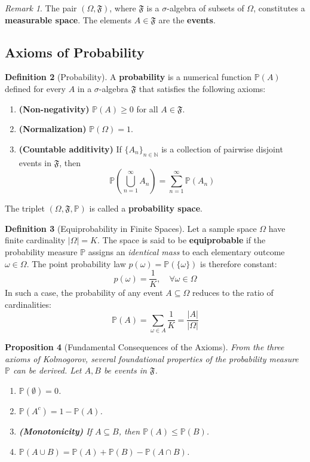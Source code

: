 \documentclass[12pt, openany]{book}
\theoremstyle{definition}
\newtheorem{definition}{Definition}[section]
\theoremstyle{plain}
\newtheorem{proposition}[definition]{Proposition}
\theoremstyle{remark}
\newtheorem{remark}[definition]{Remark}
\newcommand{\N}{\mathbb{N}}
\newcommand{\probP}{\mathbb{P}}
\newcommand{\germF}{\mathfrak{F}} %
\begin{document}
\begin{remark}
The pair $(\Omega, \germF)$, where $\germF$ is a $\sigma$-algebra of subsets of $\Omega$, constitutes a \textbf{measurable space}. The elements $A \in \germF$ are the \textbf{events}.
\end{remark}

\subsection{Axioms of Probability}

\begin{definition}[Probability]
A \textbf{probability} is a numerical function $\probP(A)$ defined for every $A$ in a $\sigma$-algebra $\germF$ that satisfies the following axioms:
\begin{enumerate}
    \item \textbf{(Non-negativity)} $\probP(A) \ge 0$ for all $A \in \germF$.
    \item \textbf{(Normalization)} $\probP(\Omega) = 1$.
    \item \textbf{(Countable additivity)} If $\{A_n\}_{n \in \N}$ is a collection of pairwise disjoint events in $\germF$, then
    $$ \probP\left( \bigcup_{n=1}^{\infty} A_n \right) = \sum_{n=1}^{\infty} \probP(A_n) $$
\end{enumerate}
The triplet $(\Omega, \germF, \probP)$ is called a \textbf{probability space}.
\end{definition}

\begin{definition}[Equiprobability in Finite Spaces]
Let a sample space $\Omega$ have finite cardinality $|\Omega| = K$. The space is said to be \textbf{equiprobable} if the probability measure $\probP$ assigns an \textit{identical mass} to each elementary outcome $\omega \in \Omega$. The point probability law $p(\omega) = \probP(\{\omega\})$ is therefore constant:
$$ p(\omega) = \frac{1}{K}, \quad \forall \omega \in \Omega $$
In such a case, the probability of any event $A \subseteq \Omega$ reduces to the ratio of cardinalities:
$$ \probP(A) = \sum_{\omega \in A} \frac{1}{K} = \frac{|A|}{|\Omega|} $$
\end{definition}

\begin{proposition}[Fundamental Consequences of the Axioms]
From the three axioms of Kolmogorov, several foundational properties of the probability measure $\probP$ can be derived. Let $A, B$ be events in $\germF$.
\begin{enumerate}
    \item $\probP(\emptyset) = 0$.
    \item $\probP(A^c) = 1 - \probP(A)$.
    \item \textbf{(Monotonicity)} If $A \subseteq B$, then $\probP(A) \le \probP(B)$.
    \item $\probP(A \cup B) = \probP(A) + \probP(B) - \probP(A \cap B)$.
\end{enumerate}
\end{proposition}
\end{document}
